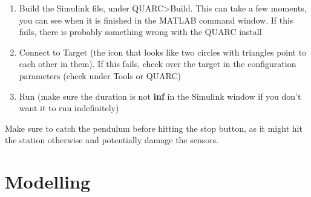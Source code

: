 \documentclass[12pt,letterpaper]{article}
\begin{document}
\begin{enumerate}
    \item Build the Simulink file, under QUARC>Build. This can take a few moments, you can see when it is finished in the MATLAB command window. If this fails, there is probably something wrong with the QUARC install
    \item Connect to Target (the icon that looks like two circles with triangles point to each other in them). If this fails, check over the target in the configuration parameters (check under Tools or QUARC)
    \item Run (make sure the duration is not \textbf{inf} in the Simulink window if you don’t want it to run indefinitely)
\end{enumerate}

Make sure to catch the pendulum before hitting the stop button, as it might hit the station otherwise and potentially damage the sensors.

\section{Modelling}
\end{document}
